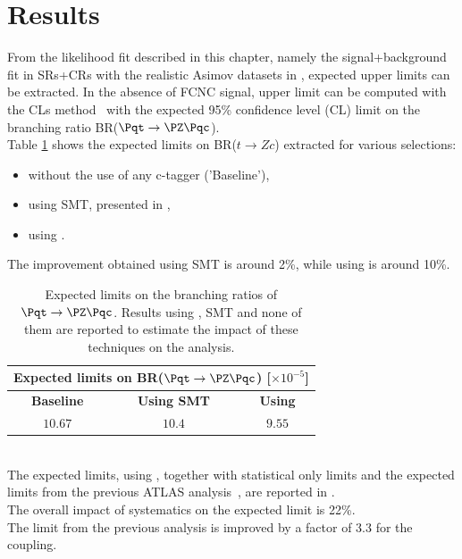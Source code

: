 \section{Results}
\label{sec:stat:tzc}
From the likelihood fit described in this chapter, namely the
signal+background fit in SRs+CRs with the realistic Asimov datasets in ,
expected upper limits can be extracted. In the absence of
FCNC signal, upper limit can be computed with the CLs method~\cite{Junk:1999kv,Read:2002hq} with the expected 95\% confidence level (CL) limit on the branching ratio BR($\Pqt\rightarrow\PZ\Pqc$).\\ 
Table \ref{tab:limits:comparison} shows the expected limits on BR($t \rightarrow Zc$) extracted for various selections: 
\begin{itemize}
\item without the use of any c-tagger ('Baseline'),
\item using SMT, presented in ,
\item using \DLrc.
\end{itemize}
The improvement obtained using SMT is around 2\%, while using \DLrc is around 10\%.
\begin{table}[htbp]
	\centering
	\begin{tabular}{c|c|c}
		\toprule
		\multicolumn{3}{c}{Expected limits on BR($\Pqt\rightarrow\PZ\Pqc$) [$ \times 10^{-5}$] }\\
		\toprule
		 \textbf{Baseline}          & \textbf{Using SMT}			& \textbf{Using \DLrc} \\
		 \midrule
		 $10.67 $ 	& $ 10.4 $   & $  9.55 $\\
		\bottomrule
	\end{tabular}
	\caption{ Expected limits on the branching ratios of $\Pqt\rightarrow\PZ\Pqc$. 
					Results using \DLrc, SMT and none of them are reported to estimate the impact of these techniques on the analysis.  }%
	\label{tab:limits:comparison}
\end{table}
\\The expected limits, using \DLrc, together
with statistical only limits and the expected limits from the previous ATLAS
analysis~\cite{TOPQ-2017-06}, are reported in
.\\
The overall impact of systematics on the expected limit is 22\%.\\
The limit from the previous analysis is improved by a factor of 3.3 for the \tZc coupling.
